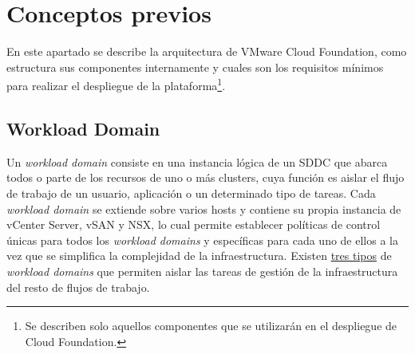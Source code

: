 \section{Conceptos previos}
En este apartado se describe la arquitectura de VMware Cloud Foundation, como estructura sus componentes internamente y cuales son los requisitos mínimos para realizar el despliegue de la plataforma\footnote{Se describen solo aquellos componentes que se utilizarán en el despliegue de Cloud Foundation.}.

\subsection{Workload Domain}
Un \textit{workload domain} consiste en una instancia lógica de un SDDC que abarca todos o parte de los recursos de uno o más clusters, cuya función es aislar el flujo de trabajo de un usuario, aplicación o un determinado tipo de tareas. Cada \textit{workload domain} se extiende sobre varios hosts y contiene su propia instancia de vCenter Server, vSAN y NSX, lo cual permite establecer políticas de control únicas para todos los \textit{workload domains} y específicas para cada uno de ellos a la vez que se simplifica la complejidad de la infraestructura. Existen \underline{tres tipos} de \textit{workload domains} que permiten aislar las tareas de gestión de la infraestructura del resto de flujos de trabajo. 

